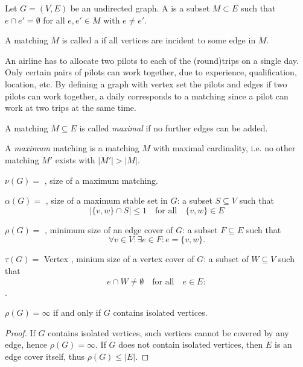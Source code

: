 \begin{lec}[2011-10-31]\end{lec}


\begin{defn}
Let $G = (V, E)$ be an undirected graph. A  is a
subset $M \subset E$ such that $e \cap e' = \emptyset $ for all $ e, e' \in M$
with $e \neq e'$.

A matching $M$ is called a  if all vertices are incident to
some edge in $M$.
\end{defn}

\begin{xmp+}
An airline has to allocate two pilots to each of the (round)trips on a
single day. Only certain pairs of pilots can work together, due to
experience, qualification, location, etc. By defining a graph with vertex
set the pilots and edges if two pilots can work together, a daily
corresponds to a matching since a pilot can work at two trips at the same
time.
\end{xmp+}

\begin{defn}
A matching $M \subseteq E$ is called \emph{maximal} if no further edges can
be added.

A \emph{maximum} matching is a matching $M$ with maximal cardinality, i.e.
no other matching $M'$ exists with $|M'| > |M|$.

$\nu(G) =$ , size of a maximum matching.
\end{defn}

$\alpha(G) = $ , size of a maximum stable set in
$G$: a subset $S \subseteq V$ such that \[
  \left|\{v, w\} \cap S \right| \leq 1 \quad \text{for all}\quad\{v, w\} \in E
\]

$\rho(G) = $ , minimum size of an
edge cover of $G$: a subset $F \subseteq E$ such that \[
\forall v \in V:\exists e \in F: e = \{ v, w \}.
\]

$\tau(G) = $ Vertex , minium size of a
vertex cover of $G$: a subset of $W \subseteq V$ such that \[
e \cap W \neq \emptyset\quad\text{for all}\quad e \in E:\].

\begin{lem}
$\rho(G) = \infty$ if and only if $G$ contains isolated vertices.
\end{lem}
\begin{proof}
If $G$ contains isolated vertices, such vertices cannot be covered by any
edge, hence $\rho(G) = \infty$. If $G$ does not contain isolated vertices,
then $E$ is an edge cover itself, thus $\rho(G) \leq |E|$.
\end{proof}

